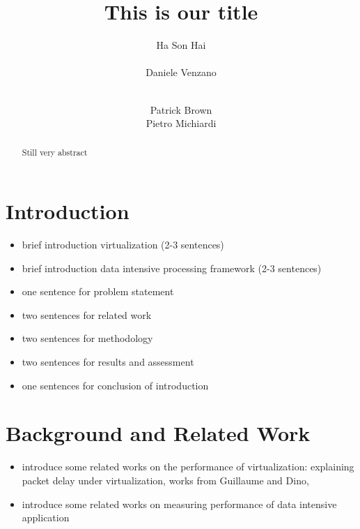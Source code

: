 \documentclass{acmsig}
\begin{document}
\title{This is our title}


\author{
\alignauthor
Ha Son Hai\\
       \\
\alignauthor
Daniele Venzano\\
       \\
\and
\alignauthor
Patrick Brown
       \\
\alignauthor
Pietro Michiardi
       \\
}

\maketitle


\begin{abstract}
Still very abstract
\end{abstract}

\section{Introduction}
\begin{itemize}
  \item brief introduction virtualization (2-3 sentences)
  \item brief introduction data intensive processing framework (2-3 sentences)
  \item one sentence for problem statement
  \item two sentences for related work
  \item two sentences for methodology
  \item two sentences for results and assessment
  \item one sentences for conclusion of introduction
\end{itemize}
\section{Background and Related Work}
\begin{itemize}
  \item introduce some related works on the performance of virtualization: explaining packet delay under virtualization, works from Guillaume and Dino,
  \item introduce some related works on measuring performance of data intensive application
\end{itemize}
\end{document}
